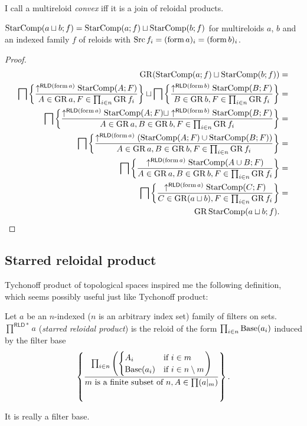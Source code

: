 \begin{defn}
I call a multireloid \emph{convex} iff
it is a join of reloidal products.\end{defn}
\begin{thm}
$\operatorname{StarComp}(a\sqcup b;f)=\operatorname{StarComp}(a;f)\sqcup\operatorname{StarComp}(b;f)$ for multireloids
$a$, $b$ and an indexed family $f$ of reloids with $\operatorname{Src} f_{i}=(\operatorname{form} a)_{i}=(\operatorname{form} b)_{i}$.\end{thm}
\begin{proof}
~
\begin{align*}
\operatorname{GR}(\operatorname{StarComp}(a;f)\sqcup\operatorname{StarComp}(b;f)) & =\\
\bigsqcap\left\{ \frac{\uparrow^{\mathsf{RLD}(\operatorname{form} a)}\operatorname{StarComp}(A;F)}{A\in\operatorname{GR} a,F\in\prod_{i\in n}\operatorname{GR} f_{i}}\right\}\sqcup\bigsqcap\left\{ \frac{\uparrow^{\mathsf{RLD}(\operatorname{form} b)}\operatorname{StarComp}(B;F)}{B\in\operatorname{GR} b,F\in\prod_{i\in n}\operatorname{GR} f_{i}}\right\} & =\\
\bigsqcap\left\{ \frac{\uparrow^{\mathsf{RLD}(\operatorname{form} a)}\operatorname{StarComp}(A;F)\sqcup\uparrow^{\mathsf{RLD}(\operatorname{form} b)}\operatorname{StarComp}(B;F)}{A\in\operatorname{GR} a,B\in\operatorname{GR} b,F\in\prod_{i\in n}\operatorname{GR} f_{i}}\right\} & =\\
\bigsqcap\left\{ \frac{\uparrow^{\mathsf{RLD}(\operatorname{form} a)}(\operatorname{StarComp}(A;F)\cup\operatorname{StarComp}(B;F))}{A\in\operatorname{GR} a,B\in\operatorname{GR} b,F\in\prod_{i\in n}\operatorname{GR} f_{i}}\right\} & =\\
\bigsqcap\left\{ \frac{\uparrow^{\mathsf{RLD}(\operatorname{form} a)}\operatorname{StarComp}(A\cup B;F)}{A\in\operatorname{GR} a,B\in\operatorname{GR} b,F\in\prod_{i\in n}\operatorname{GR} f_{i}}\right\} & =\\
\bigsqcap\left\{ \frac{\uparrow^{\mathsf{RLD}(\operatorname{form} a)}\operatorname{StarComp}(C;F)}{C\in\operatorname{GR}(a\sqcup b),F\in\prod_{i\in n}\operatorname{GR} f_{i}}\right\} & =\\
\operatorname{GR}\operatorname{StarComp}(a\sqcup b;f).
\end{align*}
\end{proof}

\subsection{Starred reloidal product}

Tychonoff product of topological spaces inspired me the following
definition, which seems possibly useful just like Tychonoff product:
\begin{defn}
Let $a$ be an $n$-indexed ($n$
is an arbitrary index set) family of filters on sets. $\prod^{\mathsf{RLD}\ast}a$
(\emph{starred reloidal product}) is the reloid of the form $\prod_{i\in n}\operatorname{Base}(a_{i})$
induced by the filter base
\[
\left\{ \frac{\prod_{i\in n}\left(\begin{cases}
A_{i} & \text{if }i\in m\\
\operatorname{Base}(a_{i}) & \text{if }i\in n\setminus m
\end{cases}\right)}{m\text{ is a finite subset of }n,A\in\prod(a|_{m})}\right\}.
\]
\end{defn}
\begin{obvious}
It is really a filter base.
\end{obvious}


